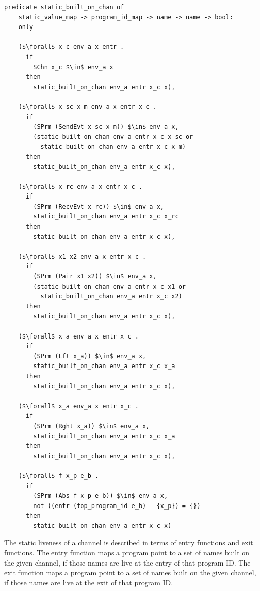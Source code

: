 \documentclass{article}
\begin{document}
\begin{lstlisting}[language=logic, mathescape]
  predicate static_built_on_chan of
    static_value_map -> program_id_map -> name -> name -> bool:
    only

    ($\forall$ x_c env_a x entr .
      if 
        SChn x_c $\in$ env_a x 
      then 
        static_built_on_chan env_a entr x_c x),

    ($\forall$ x_sc x_m env_a x entr x_c . 
      if
        (SPrm (SendEvt x_sc x_m)) $\in$ env_a x,
        (static_built_on_chan env_a entr x_c x_sc or
          static_built_on_chan env_a entr x_c x_m)
      then 
        static_built_on_chan env_a entr x_c x),

    ($\forall$ x_rc env_a x entr x_c . 
      if  
        (SPrm (RecvEvt x_rc)) $\in$ env_a x,
        static_built_on_chan env_a entr x_c x_rc
      then 
        static_built_on_chan env_a entr x_c x),

    ($\forall$ x1 x2 env_a x entr x_c . 
      if  
        (SPrm (Pair x1 x2)) $\in$ env_a x,
        (static_built_on_chan env_a entr x_c x1 or
          static_built_on_chan env_a entr x_c x2)
      then 
        static_built_on_chan env_a entr x_c x),

    ($\forall$ x_a env_a x entr x_c .
      if
        (SPrm (Lft x_a)) $\in$ env_a x,
        static_built_on_chan env_a entr x_c x_a
      then 
        static_built_on_chan env_a entr x_c x),

    ($\forall$ x_a env_a x entr x_c .
      if
        (SPrm (Rght x_a)) $\in$ env_a x,
        static_built_on_chan env_a entr x_c x_a
      then 
        static_built_on_chan env_a entr x_c x),

    ($\forall$ f x_p e_b .
      if
        (SPrm (Abs f x_p e_b)) $\in$ env_a x,
        not ((entr (top_program_id e_b) - {x_p}) = {})
      then
        static_built_on_chan env_a entr x_c x)
  \end{lstlisting}


The static liveness of a channel is described in terms of entry functions and
exit functions. The entry function maps a program point to a set of names built on
the given channel, if those names are live at the entry of that program ID.
The exit function maps a program point to a
set of names built on the given channel, if those names are live at the exit of that
program ID.
\end{document}
